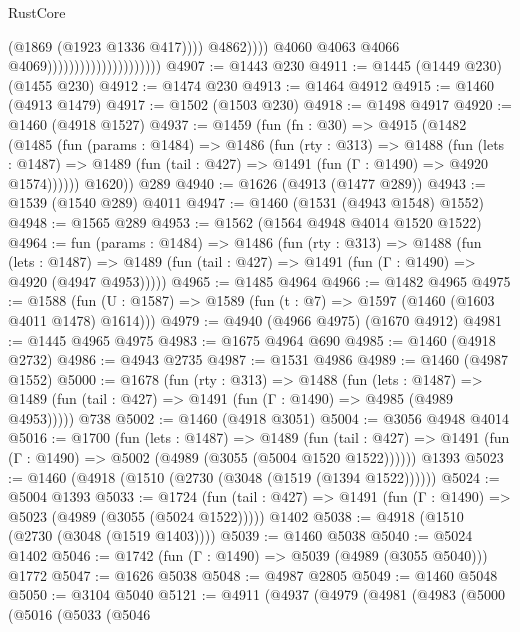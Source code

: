 \begin{lexlean}{RustCore}
\begin{coremodule}
                                                          (@1869 (@1923 @1336 @417))))
                                                      @4862))))
                                              @4060
                                              @4063
                                              @4066
                                              @4069)))))))))))))))))))))
@4907 := @1443 @230
@4911 := @1445 (@1449 @230) (@1455 @230)
@4912 := @1474 @230
@4913 := @1464 @4912
@4915 := @1460 (@4913 @1479)
@4917 := @1502 (@1503 @230)
@4918 := @1498 @4917
@4920 := @1460 (@4918 @1527)
@4937 := @1459
    (fun (fn : @30) =>
    @4915
      (@1482
        (@1485
          (fun (params : @1484) =>
          @1486
            (fun (rty : @313) =>
            @1488
              (fun (lets : @1487) =>
              @1489 (fun (tail : @427) => @1491 (fun (Γ : @1490) => @4920 @1574))))))
        @1620))
    @289
@4940 := @1626 (@4913 (@1477 @289))
@4943 := @1539 (@1540 @289) @4011
@4947 := @1460 (@1531 (@4943 @1548) @1552)
@4948 := @1565 @289
@4953 := @1562 (@1564 @4948 @4014 @1520 @1522)
@4964 := fun (params : @1484) =>
  @1486
    (fun (rty : @313) =>
    @1488
      (fun (lets : @1487) =>
      @1489 (fun (tail : @427) => @1491 (fun (Γ : @1490) => @4920 (@4947 @4953)))))
@4965 := @1485 @4964
@4966 := @1482 @4965
@4975 := @1588 (fun (U : @1587) => @1589 (fun (t : @7) => @1597 (@1460 (@1603 @4011 @1478) @1614)))
@4979 := @4940 (@4966 @4975) (@1670 @4912)
@4981 := @1445 @4965 @4975
@4983 := @1675 @4964 @690
@4985 := @1460 (@4918 @2732)
@4986 := @4943 @2735
@4987 := @1531 @4986
@4989 := @1460 (@4987 @1552)
@5000 := @1678
    (fun (rty : @313) =>
    @1488
      (fun (lets : @1487) =>
      @1489 (fun (tail : @427) => @1491 (fun (Γ : @1490) => @4985 (@4989 @4953)))))
    @738
@5002 := @1460 (@4918 @3051)
@5004 := @3056 @4948 @4014
@5016 := @1700
    (fun (lets : @1487) =>
    @1489
      (fun (tail : @427) => @1491 (fun (Γ : @1490) => @5002 (@4989 (@3055 (@5004 @1520 @1522))))))
    @1393
@5023 := @1460 (@4918 (@1510 (@2730 (@3048 (@1519 (@1394 @1522))))))
@5024 := @5004 @1393
@5033 := @1724
    (fun (tail : @427) => @1491 (fun (Γ : @1490) => @5023 (@4989 (@3055 (@5024 @1522)))))
    @1402
@5038 := @4918 (@1510 (@2730 (@3048 (@1519 @1403))))
@5039 := @1460 @5038
@5040 := @5024 @1402
@5046 := @1742 (fun (Γ : @1490) => @5039 (@4989 (@3055 @5040))) @1772
@5047 := @1626 @5038
@5048 := @4987 @2805
@5049 := @1460 @5048
@5050 := @3104 @5040
@5121 := @4911
    (@4937
      (@4979
        (@4981
          (@4983
            (@5000
              (@5016
                (@5033
                  (@5046

\end{coremodule}
\end{lexlean}
